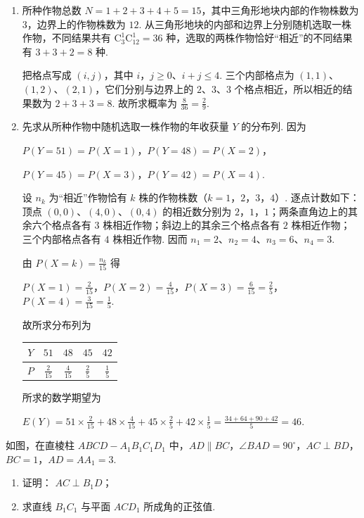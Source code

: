 \begin{solution}
\begin{enumerate}
    \item 所种作物总数 \(N=1+2+3+4+5=15\)，其中三角形地块内部的作物株数为 \(3\)，边界上的作物株数为 \(12\). 从三角形地块的内部和边界上分别随机选取一株作物，不同结果共有 \(\mathrm C_3^1\mathrm C_{12}^1=36\) 种，选取的两株作物恰好“相近”的不同结果有 \(3+3+2=8\) 种.

把格点写成 \((i,j)\)，其中 \(i\)，\(j\geqslant0\)、\(i+j\leqslant4\). 三个内部格点为 \((1,1)\)、\((1,2)\)、\((2,1)\)，它们分别与边界上的 \(2\)、\(3\)、\(3\) 个格点相近，所以相近的结果数为 \(2+3+3=8\). 故所求概率为 \(\frac{8}{36}=\frac{2}{9}\).

\item 先求从所种作物中随机选取一株作物的年收获量 \(Y\) 的分布列. 因为

\(P(Y=51)=P(X=1)\)，\(P(Y=48)=P(X=2)\)，

\(P(Y=45)=P(X=3)\)，\(P(Y=42)=P(X=4)\).

设 \(n_k\) 为“相近”作物恰有 \(k\) 株的作物株数（\(k=1\)，\(2\)，\(3\)，\(4\)）. 逐点计数如下：顶点 \((0,0)\)、\((4,0)\)、\((0,4)\) 的相近数分别为 \(2\)，\(1\)，\(1\)；两条直角边上的其余六个格点各有 \(3\) 株相近作物；斜边上的其余三个格点各有 \(2\) 株相近作物；三个内部格点各有 \(4\) 株相近作物. 因而 \(n_1=2\)、\(n_2=4\)、\(n_3=6\)、\(n_4=3\).

由 \(P(X=k)=\frac{n_k}{15}\) 得

\(P(X=1)=\frac{2}{15}\)，\(P(X=2)=\frac{4}{15}\)，\(P(X=3)=\frac{6}{15}=\frac{2}{5}\)，\(P(X=4)=\frac{3}{15}=\frac{1}{5}\).

故所求分布列为

\begin{center}
\begin{tabular}{c|cccc}
\(Y\) & \(51\) & \(48\) & \(45\) & \(42\) \\
\hline
\(P\) & \(\frac{2}{15}\) & \(\frac{4}{15}\) & \(\frac{2}{5}\) & \(\frac{1}{5}\)
\end{tabular}
\end{center}

所求的数学期望为

\(E(Y)=51\times\frac{2}{15}+48\times\frac{4}{15}+45\times\frac{2}{5}+42\times\frac{1}{5}=\frac{34+64+90+42}{5}=46\).
\end{enumerate}
\end{solution}

\begin{problem}
如图，在直棱柱 \(ABCD - A_{1}B_{1}C_{1}D_{1}\) 中，\(AD \parallel BC\)，\(\angle BAD = 90^{\circ}\)，\(AC \perp BD\)，\(BC = 1\)，\(AD = AA_{1} = 3\).
\begin{enumerate}
\item 证明： \(AC \perp B_{1}D\)；
\item 求直线 \(B_{1}C_{1}\) 与平面 \(ACD_{1}\) 所成角的正弦值.
\end{enumerate}
\end{problem}

